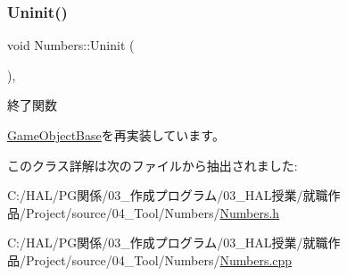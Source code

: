 \mbox{\label{class_numbers_aeaad3cc1b8ae7defe79813b983b04101}} 
\subsubsection{\texorpdfstring{Uninit()}{Uninit()}}
{\footnotesize\ttfamily void Numbers\+::\+Uninit (\begin{DoxyParamCaption}{ }\end{DoxyParamCaption})\hspace{0.3cm}{\ttfamily [override]}, {\ttfamily [virtual]}}



終了関数 



\mbox{\hyperlink{class_game_object_base_a97e1bc277d7b1c0156d4735de29a022c}{Game\+Object\+Base}}を再実装しています。



このクラス詳解は次のファイルから抽出されました\+:\begin{DoxyCompactItemize}
\item 
C\+:/\+H\+A\+L/\+P\+G関係/03\+\_\+作成プログラム/03\+\_\+\+H\+A\+L授業/就職作品/\+Project/source/04\+\_\+\+Tool/\+Numbers/\mbox{\hyperlink{_numbers_8h}{Numbers.\+h}}\item 
C\+:/\+H\+A\+L/\+P\+G関係/03\+\_\+作成プログラム/03\+\_\+\+H\+A\+L授業/就職作品/\+Project/source/04\+\_\+\+Tool/\+Numbers/\mbox{\hyperlink{_numbers_8cpp}{Numbers.\+cpp}}\end{DoxyCompactItemize}
